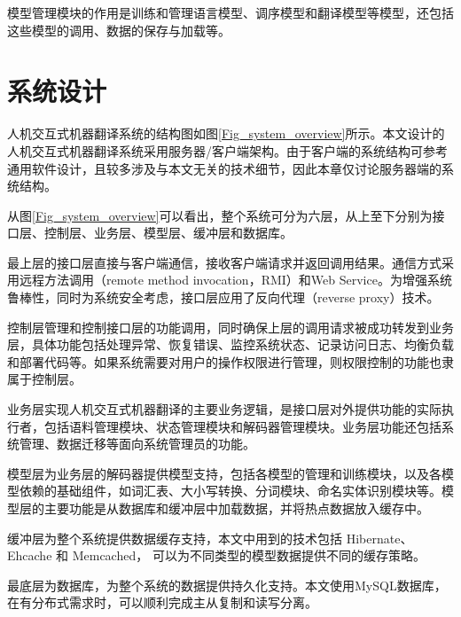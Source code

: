 模型管理模块的作用是训练和管理语言模型、调序模型和翻译模型等模型，还包括这些模型的调用、数据的保存与加载等。

\section{系统设计}

人机交互式机器翻译系统的结构图如图\ref{Fig_system_overview}所示。本文设计的人机交互式机器翻译系统采用服务器/客户端架构。由于客户端的系统结构可参考通用软件设计，且较多涉及与本文无关的技术细节，因此本章仅讨论服务器端的系统结构。

从图\ref{Fig_system_overview}可以看出，整个系统可分为六层，从上至下分别为接口层、控制层、业务层、模型层、缓冲层和数据库。

最上层的接口层直接与客户端通信，接收客户端请求并返回调用结果。通信方式采用远程方法调用（remote method invocation，RMI）和Web Service。为增强系统鲁棒性，同时为系统安全考虑，接口层应用了反向代理（reverse proxy）技术。

控制层管理和控制接口层的功能调用，同时确保上层的调用请求被成功转发到业务层，具体功能包括处理异常、恢复错误、监控系统状态、记录访问日志、均衡负载和部署代码等。如果系统需要对用户的操作权限进行管理，则权限控制的功能也隶属于控制层。

业务层实现人机交互式机器翻译的主要业务逻辑，是接口层对外提供功能的实际执行者，包括语料管理模块、状态管理模块和解码器管理模块。业务层功能还包括系统管理、数据迁移等面向系统管理员的功能。

模型层为业务层的解码器提供模型支持，包括各模型的管理和训练模块，以及各模型依赖的基础组件，如词汇表、大小写转换、分词模块、命名实体识别模块等。模型层的主要功能是从数据库和缓冲层中加载数据，并将热点数据放入缓存中。

缓冲层为整个系统提供数据缓存支持，本文中用到的技术包括 Hibernate、 Ehcache 和 Memcached， 可以为不同类型的模型数据提供不同的缓存策略。

最底层为数据库，为整个系统的数据提供持久化支持。本文使用MySQL数据库，在有分布式需求时，可以顺利完成主从复制和读写分离。

